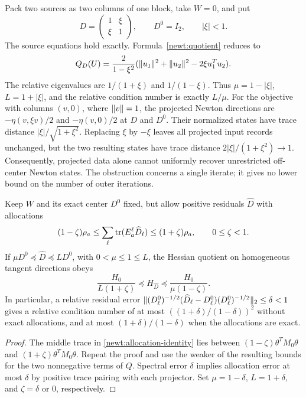 \begin{example}
\label{newt:obstruction}
Pack two sources as two columns of one block, take $W=0$, and put
\[
 D=\begin{pmatrix}1&\xi\\\xi&1\end{pmatrix},\qquad
 D^0=I_2,\qquad |\xi|<1.
\]
The source equations hold exactly.  Formula~\eqref{newt:quotient} reduces
to
\[
 Q_D(U)=\frac{2}{1-\xi^2}
  (\lVert u_1\rVert^2+\lVert u_2\rVert^2-2\xi u_1^Tu_2).
\]
The relative eigenvalues are $1/(1+\xi)$ and $1/(1-\xi)$.
Thus $\mu=1-|\xi|$, $L=1+|\xi|$, and the relative condition number
is exactly $L/\mu$.  For the objective with columns $(v,0)$, where
$\lVert v\rVert=1$, the projected Newton directions are $-\eta(v,\xi v)/2$ and
$-\eta(v,0)/2$ at $D$ and $D^0$.  Their normalized states have trace
distance $|\xi|/\sqrt{1+\xi^2}$.  Replacing $\xi$ by $-\xi$
leaves all projected input records unchanged, but the two resulting
states have trace distance $2|\xi|/(1+\xi^2)\to1$.
Consequently, projected data alone cannot uniformly recover unrestricted
off-center Newton states.  The obstruction concerns a single iterate; it
gives no lower bound on the number of outer iterations.
\end{example}

\begin{corollary}
\label{newt:inexact}
Keep $W$ and its exact center $D^0$ fixed, but allow positive residuals
$\widehat D$ with allocations
\[
 (1-\zeta)\rho_a\leq
 \sum_\ell\operatorname{tr}(E_a^\ell\widehat D_\ell)
 \leq(1+\zeta)\rho_a,\qquad 0\leq\zeta<1.
\]
If $\mu D^0\preceq\widehat D\preceq LD^0$, with
$0<\mu\leq1\leq L$, the Hessian quotient on homogeneous tangent
directions obeys
\begin{equation}\label{newt:approx-transfer}
 \frac{H_0}{L(1+\zeta)}\preceq H_{\widehat D}
       \preceq\frac{H_0}{\mu(1-\zeta)}.
\end{equation}
In particular, a relative residual error
$\lVert (D_\ell^0)^{-1/2}(\widehat D_\ell-D_\ell^0)
(D_\ell^0)^{-1/2}\rVert_2\leq\delta<1$ gives a relative condition number of at most
$((1+\delta)/(1-\delta))^2$ without exact allocations, and at most
$(1+\delta)/(1-\delta)$ when the allocations are exact.
\end{corollary}
\begin{proof}
The middle trace in \eqref{newt:allocation-identity} lies between
$(1-\zeta)\theta^TM_0\theta$ and
$(1+\zeta)\theta^TM_0\theta$.  Repeat the proof and use the weaker
of the resulting bounds for the two nonnegative terms of $Q$.
Spectral error $\delta$ implies allocation error at most $\delta$ by
positive trace pairing with each projector.  Set $\mu=1-\delta$,
$L=1+\delta$, and $\zeta=\delta$ or $0$, respectively.
\end{proof}

